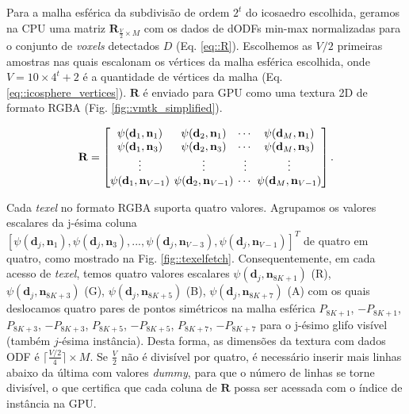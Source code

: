 Para a malha esférica da subdivisão de ordem $2^t$ do icosaedro escolhida, geramos na CPU uma matriz $\mathbf{R}_{\frac{V}{2} \times M}$ com os dados de dODFs min-max normalizadas para o conjunto de \textit{voxels} detectados $D$ (Eq. \ref{eq::R}). Escolhemos as $V/2$ primeiras amostras nas quais escalonam os vértices da malha esférica escolhida, onde $V = 10 \times 4^t + 2$ é a quantidade de vértices da malha (Eq. \ref{eq::icosphere_vertices}). $\mathbf{R}$ é enviado para GPU como uma textura 2D de formato RGBA (Fig. \ref{fig::vmtk_simplified}).


\begin{equation}
\label{eq::R}
\mathbf{R} = 
\begingroup %
\setlength\arraycolsep{2pt}
\begin{bmatrix} 
    \psi(\mathbf{d}_{1}, \mathbf{n}_1) &
    \psi(\mathbf{d}_{2}, \mathbf{n}_1) & \cdots & 
    \psi(\mathbf{d}_{M}, \mathbf{n}_1)  \\
    
    \psi(\mathbf{d}_{1}, \mathbf{n}_3) &
    \psi(\mathbf{d}_{2}, \mathbf{n}_3) & \cdots & 
    \psi(\mathbf{d}_{M}, \mathbf{n}_{3}) \\ \vdots & \vdots & \vdots & \vdots  \\
    
    \psi(\mathbf{d}_{1}, \mathbf{n}_{V-1}) & 
    \psi(\mathbf{d}_{2}, \mathbf{n}_{V-1}) & \cdots & 
    \psi(\mathbf{d}_{M}, \mathbf{n}_{V-1})
\end{bmatrix}.
\endgroup
\end{equation}

Cada \textit{texel} no formato RGBA suporta quatro valores. Agrupamos os valores escalares da j-ésima coluna $[
\psi(\mathbf{d}_{j}, \mathbf{n}_1),
\psi(\mathbf{d}_{j}, \mathbf{n}_3), ...,
\psi(\mathbf{d}_{j}, \mathbf{n}_{V-3}),
\psi(\mathbf{d}_{j}, \mathbf{n}_{V-1})
]^T$ de quatro em quatro, como mostrado na Fig. \ref{fig::texelfetch}. Consequentemente, em cada acesso de \textit{texel}, temos quatro valores escalares $
\psi(\mathbf{d}_{j}, \mathbf{\mathbf{n}}_{8K+1})$ (R), $
\psi(\mathbf{d}_{j}, \mathbf{\mathbf{n}}_{8K+3})$ (G), $
\psi(\mathbf{d}_{j}, \mathbf{\mathbf{n}}_{8K+5})$ (B), $
\psi(\mathbf{d}_{j}, \mathbf{\mathbf{n}}_{8K+7})$ (A) com os quais deslocamos quatro pares de pontos simétricos na malha esférica $P_{8K+1}$, $-P_{8K+1}$, $P_{8K+3}$, $-P_{8K+3}$, $P_{8K+5}$, $-P_{8K+5}$, $P_{8K+7}$, $-P_{8K+7}$ para o j-ésimo glifo visível (também $j$-ésima instância). Desta forma, as dimensões da textura com dados ODF é $ \lceil \frac{V/2}{4} \rceil \times M$. Se $\frac{V}{2}$ não é divisível por quatro, é necessário inserir mais linhas abaixo da última com valores \textit{dummy}, para que o número de linhas se torne divisível, o que certifica que cada coluna de $\mathbf{R}$ possa ser acessada com o índice de instância na GPU.

